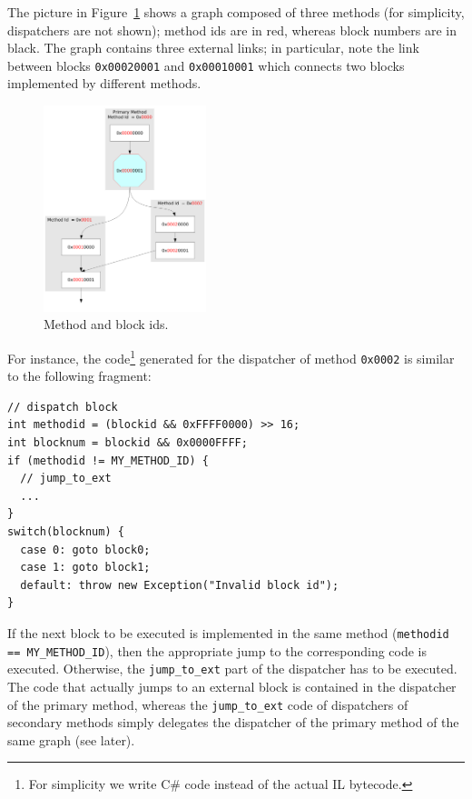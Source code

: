 The picture in Figure~\ref{block-id-fig} shows a graph composed of three methods (for
simplicity, dispatchers are not shown); method ids are in red, whereas
block numbers are in black. 
The graph contains three external links; in particular, note the link
between blocks \texttt{0x00020001} and \texttt{0x00010001} which
connects two blocks implemented by different methods.
\begin{figure}[h]
\begin{center}
\includegraphics[height=6cm]{blockid}
\caption{Method and block ids.}\label{block-id-fig}
\end{center}
\end{figure}

For instance, the code\footnote{For simplicity we write C\# code instead of
the actual IL bytecode.} generated for the dispatcher of method \texttt{0x0002}
is similar to the following fragment: 
\begin{small}
\begin{lstlisting}[language={[Sharp]C}]
// dispatch block
int methodid = (blockid && 0xFFFF0000) >> 16; 
int blocknum = blockid && 0x0000FFFF;         
if (methodid != MY_METHOD_ID) {
  // jump_to_ext 
  ...
}
switch(blocknum) {
  case 0: goto block0;
  case 1: goto block1;
  default: throw new Exception("Invalid block id");
}
\end{lstlisting}
\end{small}
If the next block to be executed is implemented in the same method
({\small\lstinline{methodid == MY_METHOD_ID}}), then the appropriate
jump to the corresponding code is executed.
Otherwise, the \lstinline{jump_to_ext}
part of the dispatcher has to be executed.
The code that actually jumps to an external block is contained in
the dispatcher of the primary method, whereas the
\lstinline{jump_to_ext} code of dispatchers of secondary methods
simply delegates the dispatcher of the primary method of the same
graph (see later).

